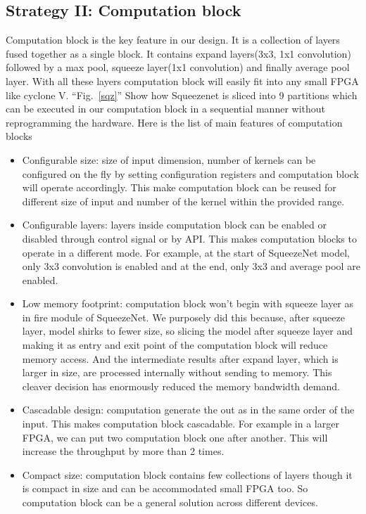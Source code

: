 \documentclass[conference]{IEEEtran}
\begin{document}
\subsection{Strategy II: Computation block}
Computation block is the key feature in our design. It is a collection of layers fused together as a single block. It contains expand layers(3x3, 1x1 convolution) followed by a max pool, squeeze layer(1x1 convolution) and finally average pool layer. With all these layers computation block will easily fit into any small FPGA like cyclone V. ``Fig.~\ref{sqz}'' Show how Squeezenet is sliced into 9 partitions which can be executed in our computation block in a sequential manner without reprogramming the hardware. Here is the list of main features of computation blocks

\begin{itemize}
\item Configurable size: size of input dimension, number of kernels can be configured on the fly by setting configuration registers and computation block will operate accordingly. This make computation block can be reused for different size of input and number of the kernel within the provided range.

\item Configurable layers: layers inside computation block can be enabled or disabled through control signal or by API. This makes computation blocks to operate in a different mode. For example, at the start of SqueezeNet model, only 3x3 convolution is enabled and at the end, only 3x3 and average pool are enabled.

\item Low memory footprint: computation block won't begin with squeeze layer as in fire module of SqueezeNet. We purposely did this because, after squeeze layer, model shirks to fewer size, so slicing the model after squeeze layer and making it as entry and exit point of the computation block will reduce memory access. And the intermediate results after expand layer, which is larger in size, are processed internally without sending to memory. This cleaver decision has enormously reduced the memory bandwidth demand. 


\item Cascadable design: computation generate the out as in the same order of the input. This makes computation block cascadable. For example in a larger FPGA, we can put two computation block one after another. This will increase the throughput by more than 2 times.

\item Compact size: computation block contains few collections of layers though it is compact in size and can be accommodated small FPGA too. So computation block can be a general solution across different devices.

\end{itemize}
\end{document}
